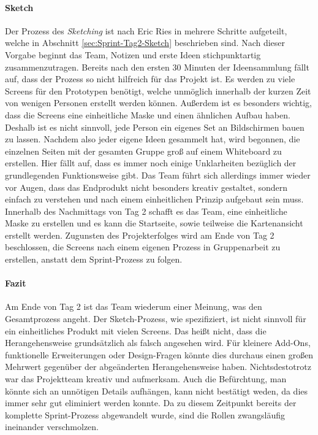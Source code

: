 \paragraph{Sketch}
\label{ref:Sprint-Umsetzung-Sketch}
Der Prozess des \textit{Sketching} ist nach Eric Ries in mehrere Schritte aufgeteilt, welche in Abschnitt \ref{sec:Sprint-Tag2-Sketch} beschrieben sind. Nach dieser Vorgabe beginnt das Team, Notizen und erste Ideen stichpunktartig zusammenzutragen. Bereits nach den ersten 30 Minuten der Ideensammlung fällt auf, dass der Prozess so nicht hilfreich für das Projekt ist. Es werden zu viele Screens für den Prototypen benötigt, welche unmöglich innerhalb der kurzen Zeit von wenigen Personen erstellt werden können. Außerdem ist es besonders wichtig, dass die Screens eine einheitliche Maske und einen ähnlichen Aufbau haben. Deshalb ist es nicht sinnvoll, jede Person ein eigenes Set an Bildschirmen bauen zu lassen. Nachdem also jeder eigene Ideen gesammelt hat, wird begonnen, die einzelnen Seiten mit der gesamten Gruppe groß auf einem Whiteboard zu erstellen. Hier fällt auf, dass es immer noch einige Unklarheiten bezüglich der grundlegenden Funktionsweise gibt. Das Team führt sich allerdings immer wieder vor Augen, dass das Endprodukt nicht besonders kreativ gestaltet, sondern einfach zu verstehen und nach einem einheitlichen Prinzip aufgebaut sein muss. Innerhalb des Nachmittags von Tag 2 schafft es das Team, eine einheitliche Maske zu erstellen und es kann die Startseite, sowie teilweise die Kartenansicht erstellt werden.
Zugunsten des Projekterfolges wird am Ende von Tag 2 beschlossen, die Screens nach einem eigenen Prozess in Gruppenarbeit zu erstellen, anstatt dem Sprint-Prozess zu folgen.

\paragraph{Fazit}
Am Ende von Tag 2 ist das Team wiederum einer Meinung, was den Gesamtprozess angeht. Der Sketch-Prozess, wie spezifiziert, ist nicht sinnvoll für ein einheitliches Produkt mit vielen Screens. Das heißt nicht, dass die Herangehensweise grundsätzlich als falsch angesehen wird. Für kleinere Add-Ons, funktionelle Erweiterungen oder Design-Fragen könnte dies durchaus einen großen Mehrwert gegenüber der abgeänderten Herangehensweise haben. Nichtsdestotrotz war das Projektteam kreativ und aufmerksam.  Auch die Befürchtung, man könnte sich an unnötigen Details aufhängen, kann nicht bestätigt weden, da dies immer sehr gut eliminiert werden konnte. Da zu diesem Zeitpunkt bereits der komplette Sprint-Prozess abgewandelt wurde, sind die Rollen zwangsläufig ineinander verschmolzen.

